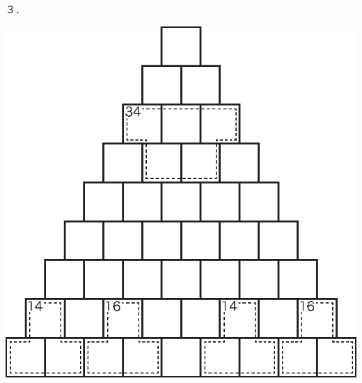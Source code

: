\documentclass[./main]{subfiles}
\begin{document}
\begin{minipage}{0.5625\hsize}
\vspace{15pt}３．\vspace{-15pt}
\begin{center}
\includegraphics{manuscript/morikawa_image/morikawa_puzzle_3.eps}
\end{center}
\end{minipage}
\end{document}
